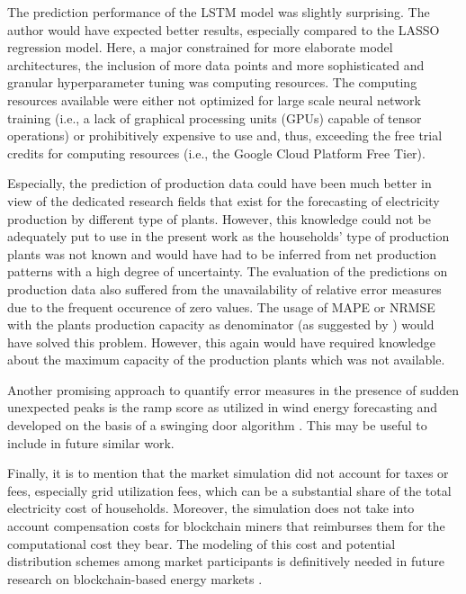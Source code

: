 The prediction performance of the LSTM model was slightly surprising. The author would have expected better results, especially compared to the LASSO regression model. Here, a major constrained for more elaborate model architectures, the inclusion of more data points and more sophisticated and granular hyperparameter tuning was computing resources. The computing resources available were either not optimized for large scale neural network training (i.e., a lack of graphical processing units (GPUs) capable of tensor operations) or prohibitively expensive to use and, thus, exceeding the free trial credits for computing resources (i.e., the Google Cloud Platform Free Tier).

Especially, the prediction of production data could have been much better in view of the dedicated research fields that exist for the forecasting of electricity production by different type of plants. However, this knowledge could not be adequately put to use in the present work as the households' type of production plants was not known and would have had to be inferred from net production patterns with a high degree of uncertainty. The evaluation of the predictions on production data also suffered from the unavailability of relative error measures due to the frequent occurence of zero values. The usage of MAPE or NRMSE with the plants production capacity as denominator (as suggested by \citet{Hoff:2013}) would have solved this problem. However, this again would have required knowledge about the maximum capacity of the production plants which was not available.

Another promising approach to quantify error measures in the presence of sudden unexpected peaks is the ramp score as utilized in wind energy forecasting and developed on the basis of a swinging door algorithm \citep[e.g.,][]{Bianco:2016, Florita:2013}. This may be useful to include in future similar work.

Finally, it is to mention that the market simulation did not account for taxes or fees, especially grid utilization fees, which can be a substantial share of the total electricity cost of households. Moreover, the simulation does not take into account compensation costs for blockchain miners that reimburses them for the computational cost they bear. The modeling of this cost and potential distribution schemes among market participants is definitively needed in future research on blockchain-based energy markets \citep[see also][]{Mengelkamp:2018a}.




